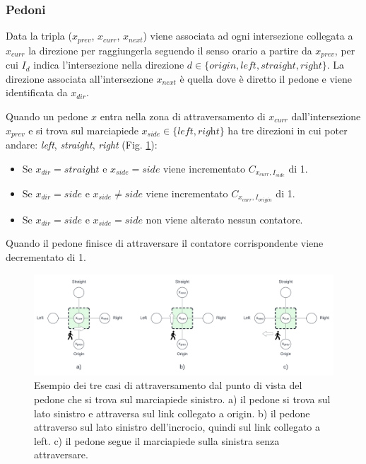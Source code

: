 \subsubsection{Pedoni}

Data la tripla ($x_{prev}$, $x_{curr}$, $x_{next}$) viene associata ad ogni intersezione collegata a $x_{curr}$ la direzione per raggiungerla seguendo il senso orario a partire da $x_{prev}$,
per cui $I_d$ indica l'intersezione nella direzione $d \in \{\textit{origin}, \textit{left}, \textit{straight}, \textit{right}\}$.
%
La direzione associata all'intersezione $x_{next}$ è quella dove è diretto il pedone e viene identificata da $x_{dir}$.

Quando un pedone $x$ entra nella zona di attraversamento di $x_{curr}$ dall'intersezione $x_{prev}$ e si trova sul marciapiede $x_{side} \in \{ \textit{left}, \textit{right} \}$ 
ha tre direzioni in cui poter andare: \textit{left}, \textit{straight}, \textit{right} (Fig. \ref{fig:pedestria-crossing}):
\begin{itemize}
    \item Se $x_{dir} = \textit{straight}$ e $x_{side} = \textit{side}$ viene incrementato $C_{x_{curr}, I_{\textit{side}}}$ di 1.
    \item Se $x_{dir} = \textit{side}$ e $x_{side} \neq \textit{side}$ viene incrementato $C_{x_{curr}, I_{\textit{origin}}}$ di 1.
    \item Se  $x_{dir} = \textit{side}$ e $x_{side} = \textit{side}$ non viene alterato nessun contatore.
\end{itemize}

Quando il pedone finisce di attraversare il contatore corrispondente viene decrementato di 1.


\begin{figure}[ht]
    \centering
    \includegraphics[width=\textwidth]{images/pedestrian_crossing}
    \caption{
        Esempio dei tre casi di attraversamento dal punto di vista del pedone che si trova sul marciapiede sinistro.
        a) il pedone si trova sul lato sinistro e attraversa sul link collegato a origin.
        b) il pedone attraverso sul lato sinistro dell'incrocio, quindi sul link collegato a left.
        c) il pedone segue il marciapiede sulla sinistra senza attraversare.
    }
    \label{fig:pedestria-crossing}
\end{figure}


